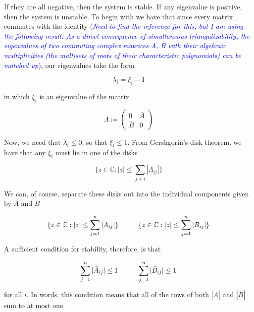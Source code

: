 \documentclass[preprint,12pt]{article}
\theoremstyle{definition}
\theoremstyle{theorem}
\theoremstyle{remark}
\theoremstyle{example}
\newcommand{\ah}[1]{\textcolor{blue}{\textit{#1}}}
\begin{document}
	If they are all negative, then the system is stable. If any eigenvalue is positive, then the system is unstable. To begin with we have that since every matrix commutes with the identity (\ah{Need to find the reference for this, but I am using the following result: As a direct consequence of simultaneous triangulizability, the eigenvalues of two commuting complex matrices A, B with their algebraic multiplicities (the multisets of roots of their characteristic polynomials) can be matched up}), our eigenvalues take the form
	
	\begin{equation}
		\lambda_i = \xi_i - 1		
	\end{equation}
		
	in which $\xi_i$ is an eigenvalue of the matrix 
	
	 \begin{equation}
	 	\Lambda := \begin{pmatrix}
	 		0 & \bar{A} \\ \bar{B} & 0
	 	\end{pmatrix}
	 \end{equation}
	
	Now, we need that $\lambda_i \leq 0$, so that $\xi_i \leq 1$. From Gershgorin's disk theorem, we have that any $\xi_i$ must lie in one of the disks
	
	\begin{equation}
		\{ z \in \mathbb{C} : |z| \leq \sum_{j \neq i} |\Lambda_{ij}| \}
	\end{equation}
	
	We can, of course, separate these disks out into the individual components given by $\bar{A}$ and $\bar{B}$
	
	\begin{equation}
		\{ z \in \mathbb{C} : |z| \leq \sum_{j = 1}^{n} |\bar{A}_{ij}| \} \hspace*{1cm} \{ z \in \mathbb{C} : |z| \leq \sum_{j = 1}^{n} |\bar{B}_{ij}| \}
	\end{equation}
	
	A sufficient condition for stability, therefore, is that
	
	\begin{equation}
		\sum_{j = 1}^{n} |\bar{A}_{ij}| \leq 1 \hspace*{1cm} \sum_{j = 1}^{n} |\bar{B}_{ij}| \leq 1
	\end{equation}
	
	for all $i$. In words, this condition means that all of the rows of both $|\bar{A}|$ and $|\bar{B}|$ sum to at most one.
	
\end{document}
